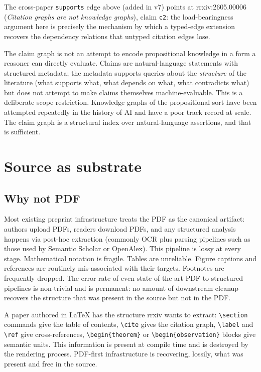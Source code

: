 \documentclass[11pt]{rrxiv}
\begin{document}
The cross-paper \texttt{supports} edge above (added in v7) points at rrxiv:2605.00006 (\emph{Citation graphs are not knowledge graphs}), claim \texttt{c2}: the load-bearingness argument here is precisely the mechanism by which a typed-edge extension recovers the dependency relations that untyped citation edges lose.

\begin{rrxivremark}
The claim graph is not an attempt to encode propositional knowledge in a form a reasoner can directly evaluate. Claims are natural-language statements with structured metadata; the metadata supports queries about the \emph{structure} of the literature (what supports what, what depends on what, what contradicts what) but does not attempt to make claims themselves machine-evaluable. This is a deliberate scope restriction. Knowledge graphs of the propositional sort have been attempted repeatedly in the history of AI and have a poor track record at scale. The claim graph is a structural index over natural-language assertions, and that is sufficient.
\end{rrxivremark}

\section{Source as substrate}
\label{sec:source}

\subsection{Why not PDF}

Most existing preprint infrastructure treats the PDF as the canonical artifact: authors upload PDFs, readers download PDFs, and any structured analysis happens via post-hoc extraction (commonly OCR plus parsing pipelines such as those used by Semantic Scholar or OpenAlex). This pipeline is lossy at every stage. Mathematical notation is fragile. Tables are unreliable. Figure captions and references are routinely mis-associated with their targets. Footnotes are frequently dropped. The error rate of even state-of-the-art PDF-to-structured pipelines is non-trivial and is permanent: no amount of downstream cleanup recovers the structure that was present in the source but not in the PDF.

\begin{evidence}
A paper authored in LaTeX has the structure rrxiv wants to extract: \texttt{\textbackslash section} commands give the table of contents, \texttt{\textbackslash cite} gives the citation graph, \texttt{\textbackslash label} and \texttt{\textbackslash ref} give cross-references, \texttt{\textbackslash begin\{theorem\}} or \texttt{\textbackslash begin\{observation\}} blocks give semantic units. This information is present at compile time and is destroyed by the rendering process. PDF-first infrastructure is recovering, lossily, what was present and free in the source.
\end{evidence}
\end{document}
